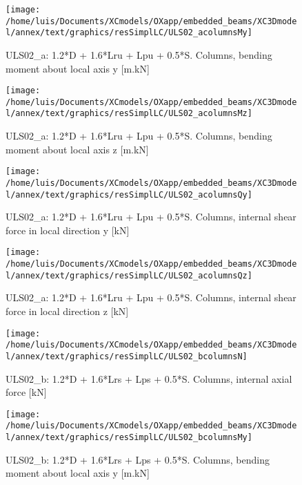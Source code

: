 \begin{figure}
\begin{center}
\texttt{[image: /home/luis/Documents/XCmodels/OXapp/embedded\_beams/XC3Dmodel/annex/text/graphics/resSimplLC/ULS02\_acolumnsMy]}
\caption{ULS02_a: 1.2*D + 1.6*Lru + Lpu + 0.5*S. Columns, bending moment about local axis y [m.kN]}
\end{center}
\end{figure}
\begin{figure}
\begin{center}
\texttt{[image: /home/luis/Documents/XCmodels/OXapp/embedded\_beams/XC3Dmodel/annex/text/graphics/resSimplLC/ULS02\_acolumnsMz]}
\caption{ULS02_a: 1.2*D + 1.6*Lru + Lpu + 0.5*S. Columns, bending moment about local axis z [m.kN]}
\end{center}
\end{figure}
\begin{figure}
\begin{center}
\texttt{[image: /home/luis/Documents/XCmodels/OXapp/embedded\_beams/XC3Dmodel/annex/text/graphics/resSimplLC/ULS02\_acolumnsQy]}
\caption{ULS02_a: 1.2*D + 1.6*Lru + Lpu + 0.5*S. Columns, internal shear force in local direction y [kN]}
\end{center}
\end{figure}
\begin{figure}
\begin{center}
\texttt{[image: /home/luis/Documents/XCmodels/OXapp/embedded\_beams/XC3Dmodel/annex/text/graphics/resSimplLC/ULS02\_acolumnsQz]}
\caption{ULS02_a: 1.2*D + 1.6*Lru + Lpu + 0.5*S. Columns, internal shear force in local direction z [kN]}
\end{center}
\end{figure}
\clearpage
\begin{figure}
\begin{center}
\texttt{[image: /home/luis/Documents/XCmodels/OXapp/embedded\_beams/XC3Dmodel/annex/text/graphics/resSimplLC/ULS02\_bcolumnsN]}
\caption{ULS02_b: 1.2*D + 1.6*Lrs + Lps + 0.5*S. Columns, internal axial force [kN]}
\end{center}
\end{figure}
\begin{figure}
\begin{center}
\texttt{[image: /home/luis/Documents/XCmodels/OXapp/embedded\_beams/XC3Dmodel/annex/text/graphics/resSimplLC/ULS02\_bcolumnsMy]}
\caption{ULS02_b: 1.2*D + 1.6*Lrs + Lps + 0.5*S. Columns, bending moment about local axis y [m.kN]}
\end{center}
\end{figure}
